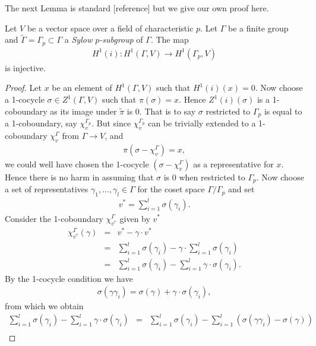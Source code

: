 The next Lemma is standard [reference] but we give our own proof here.
\begin{lemma}\label{mapFromSylow}
Let $V$ be a vector space over a field of characteristic $p$. Let $\Gamma$ be a finite group and $\tilde{\Gamma} = \Gamma_p \subset \Gamma$ a \emph{Sylow $p$-subgroup} of $\Gamma$. The map 
\begin{eqnarray*}
H^1(i):H^1(\Gamma, V)\rightarrow H^1(\Gamma_p, V)
\end{eqnarray*}
is injective.
\end{lemma}
\begin{proof}
Let $x$ be an element of $H^1(\Gamma, V)$ such that $H^1(i)(x) = 0$. Now choose a 1-cocycle $\sigma \in Z^1(\Gamma, V)$ such that $\pi(\sigma) = x$. Hence $Z^1(i)(\sigma)$ is a 1-coboundary as its image under $\tilde\pi$ is 0. That is to say $\sigma$ restricted to $\Gamma_p$ is equal to a 1-coboundary, say $\chi_v^{\Gamma_p}$. But since $\chi_v^{\Gamma_p}$ can be trivially extended to a 1-coboundary $\chi_v^\Gamma$ from $\Gamma\rightarrow V$, and
\begin{eqnarray*}
	\pi(\sigma - \chi_v^\Gamma) = x,
\end{eqnarray*}
we could well have chosen the 1-cocycle $(\sigma - \chi_v^\Gamma)$ as a representative for $x$. Hence there is no harm in assuming that $\sigma$ is 0 when restricted to $\Gamma_p$.
Now choose a set of representatives $\gamma_1, \ldots, \gamma_l \in \Gamma$ for the coset space $\Gamma/\Gamma_p$ and set
\begin{eqnarray*}
	v^* = \sum_{i =1}^l \sigma(\gamma_i).
\end{eqnarray*}
Consider the 1-coboundary $\chi_{v^*}^\Gamma$ given by $v^*$
\begin{eqnarray*}
	\chi_{v^*}^\Gamma(\gamma) &=& v^* - \gamma\cdot v^* \\
	&=& \sum_{i = 1}^l\sigma(\gamma_i) - \gamma\cdot \sum_{i = 1}^l\sigma(\gamma_i) \\
	&=& \sum_{i = 1}^l\sigma(\gamma_i) - \sum_{i = 1}^l \gamma\cdot \sigma(\gamma_i).
\end{eqnarray*}
By the 1-cocycle condition we have
\begin{eqnarray*}
	\sigma(\gamma \gamma_i) = \sigma(\gamma) + \gamma\cdot\sigma(\gamma_i),
\end{eqnarray*}
from which we obtain
\begin{eqnarray*}
	 \sum_{i = 1}^l\sigma(\gamma_i) - \sum_{i = 1}^l \gamma\cdot \sigma(\gamma_i) 
	&=& \sum_{i = 1}^l\sigma(\gamma_i) - \sum_{i = 1}^l \left(\sigma(\gamma\gamma_i) - \sigma(\gamma) \right)\\

\end{eqnarray*}
\end{proof}
